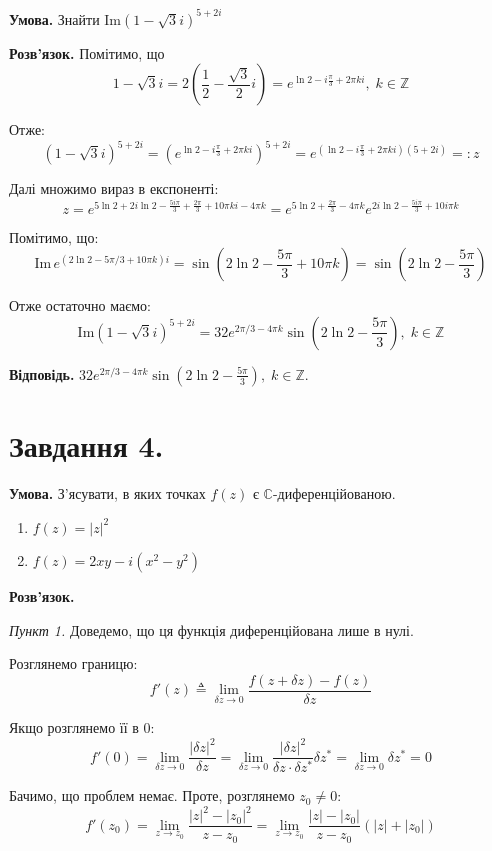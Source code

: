 \documentclass[12pt]{extarticle}
\begin{document}
\textbf{Умова.} Знайти $\text{Im} (1-\sqrt{3}i)^{5+2i}$

\textbf{Розв'язок.} Помітимо, що
\[
1 - \sqrt{3}i = 2\left(\frac{1}{2} - \frac{\sqrt{3}}{2}i\right) = e^{\ln 2-i\frac{\pi}{3} + 2\pi k i}, \; k \in \mathbb{Z}
\]

Отже:
\[
(1-\sqrt{3}i)^{5+2i} = (e^{\ln 2-i\frac{\pi}{3}+2\pi ki})^{5+2i} = e^{(\ln 2 - i\frac{\pi}{3}+2\pi ki)(5+2i)} =: z
\]

Далі множимо вираз в експоненті:
\[
z = e^{5\ln 2 + 2i\ln 2 - \frac{5i\pi}{3} + \frac{2\pi}{3} + 10\pi ki - 4\pi k} = e^{5\ln 2 + \frac{2\pi}{3}-4\pi k}e^{2i \ln 2 - \frac{5i\pi}{3} + 10i\pi k} 
\]

Помітимо, що:
\[
\text{Im}\, e^{(2\ln 2 - 5\pi/3+10\pi k)i} = \sin\left(2\ln 2 - \frac{5\pi}{3} + 10\pi k\right) = \sin\left(2\ln 2 - \frac{5\pi}{3}\right)
\]

Отже остаточно маємо:
\[
\text{Im} (1-\sqrt{3}i)^{5+2i} = 32e^{2\pi/3-4\pi k}\sin\left(2\ln 2 - \frac{5\pi}{3}\right), \; k \in \mathbb{Z}
\]

\textbf{Відповідь.} $32e^{2\pi/3-4\pi k}\sin\left(2\ln 2 - \frac{5\pi}{3}\right), \; k \in \mathbb{Z}$.

\section*{Завдання 4.}

\textbf{Умова.} З'ясувати, в яких точках $f(z)$ є $\mathbb{C}$-диференційованою.

\begin{enumerate}
    \item $f(z)=|z|^2$
    \item $f(z)=2xy - i(x^2-y^2)$
\end{enumerate}

\textbf{Розв'язок.}

\textit{Пункт 1.} Доведемо, що ця функція диференційована лише в нулі.

Розглянемо границю:
\[
f'(z) \triangleq \lim_{\delta z \to 0} \frac{f(z+\delta z) - f(z)}{\delta z}
\]

Якщо розглянемо її в $0$:
\[
f'(0) = \lim_{\delta z \to 0} \frac{|\delta z|^2}{\delta z} = \lim_{\delta z \to 0} \frac{|\delta z|^2}{\delta z \cdot \delta z^*}\delta z^* = \lim_{\delta z \to 0} \delta z^* = 0
\]

Бачимо, що проблем немає. Проте, розглянемо $z_0 \neq 0$:
\[
f'(z_0) = \lim_{z \to z_0} \frac{|z|^2 - |z_0|^2}{z - z_0} = \lim_{z \to z_0} \frac{|z|-|z_0|}{z-z_0}(|z|+|z_0|)
\]
\end{document}
